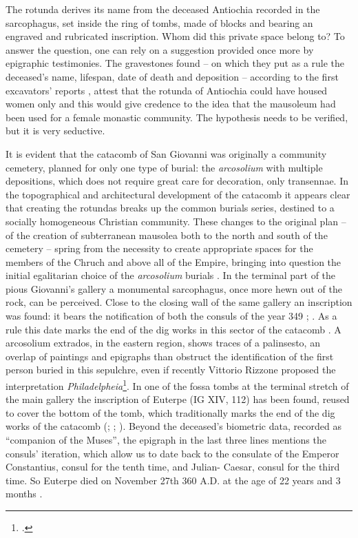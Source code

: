\documentclass[amsthm,ebook]{saparticle}
\begin{document}
The rotunda derives its name from the deceased Antiochia recorded in the sarcophagus, set inside the ring of tombs, made of blocks and bearing an engraved and rubricated inscription. Whom did this private space belong to? To answer the question, one can rely on a suggestion provided once more by epigraphic testimonies. The gravestones found – on which they put as a rule the deceased’s name, lifespan, date of death and deposition – according to the first excavators’ reports \citep[23-45]{CARINI1873}, attest that the rotunda of Antiochia could have housed women only and this would give credence to the idea that the mausoleum had been used for a female monastic community. The hypothesis needs to be verified, but it is very seductive.

It is evident that the catacomb of San Giovanni was originally a community cemetery, planned for only one type of burial: the \emph{arcosolium} with multiple depositions, which does not require great care for decoration, only transennae. In the topographical and architectural development of the catacomb it appears clear that creating the rotundas breaks up the common burials series, destined to a socially homogeneous Christian community. These changes to the original plan – of the creation of subterranean mausolea both to the north and south of the cemetery – spring from the necessity to create appropriate spaces for the members of the Chruch and above all of the Empire, bringing into question the initial egalitarian choice of the \emph{arcosolium} burials \citep[767]{GRIESHEIMER1989}. In the terminal part of the pious Giovanni’s gallery a monumental sarcophagus, once more hewn out of the rock, can be perceived. Close to the closing wall of the same gallery an inscription was found: it bears the notification of both the consuls of the year 349 %
; \citep[89]{AGNELLO1953}. As a rule this date marks the end of the dig works in this sector of the catacomb \citep[75-76]{FERRUA1952}. A arcosolium extrados, in the eastern region, shows traces of a palinsesto, an overlap of paintings and epigraphs than obstruct the identification of the first person buried in this sepulchre, even if recently Vittorio Rizzone proposed the interpretation \emph{Philadelpheia}\footnote{\citet[45-48]{RIZZONE2012}.}. In one of the fossa tombs at the terminal stretch of the main gallery the inscription of Euterpe (IG XIV, 112) has been found, reused to cover the bottom of the tomb, which traditionally marks the end of the dig works of the catacomb (\citealp[75-76]{FERRUA1952}; \citealp[79]{AGNELLO1958}; \citealp[781]{GRIESHEIMER1989}). Beyond the deceased’s biometric data, recorded as ``companion of the Muses'', the epigraph in the last three lines mentions the consuls’ iteration, which allow us to date back to the consulate of the Emperor Constantius, consul for the tenth time, and Julian- Caesar, consul for the third time. So Euterpe died on November 27th 360 A.D. at the age of 22 years and 3 months \citep[524-526]{GUARDUCCI1978}.
\end{document}
